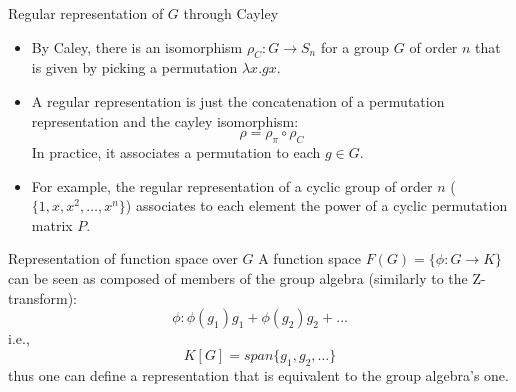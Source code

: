 \documentclass[presentation]{beamer}
\begin{document}
\begin{frame}[label={sec:org08ccdc6}]{Regular representation of \(G\) through Cayley}
\begin{itemize}
\item By Caley, there is an isomorphism \(\rho_C: G \rightarrow S_n\) for a group
\(G\) of order \(n\) that is given by picking a permutation \(\lambda x.gx\).

\item A regular representation is just the concatenation of a permutation
representation and the cayley isomorphism: $$\rho = \rho_{\pi} \circ
      \rho_{C}$$ In practice, it associates a permutation to each \(g \in G\).

\item For example, the regular representation of a cyclic group of order \(n\)
(\(\{1,x,x^2,\ldots, x^n\}\)) associates to each element the power of a
cyclic permutation matrix \(P\).
\end{itemize}
\end{frame}

\begin{frame}[label={sec:orgca2bcae}]{Representation of function space over \(G\)}
A function space \(F(G) = \{ \phi: G \rightarrow K \}\) can be seen as composed
of members of the group algebra (similarly to the Z-transform): $$\phi:
    \phi(g_1)g_1 + \phi(g_2)g_2 + \ldots$$ i.e., $$K[G]=span\{g_1, g_2, \ldots
    \}$$ thus one can define a representation that is equivalent to the group
algebra's one.
\end{frame}
\end{document}
